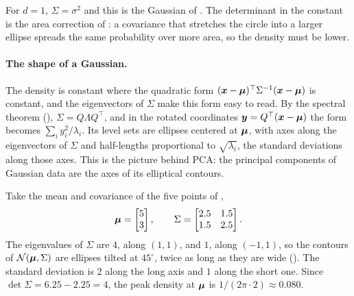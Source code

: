 For $d = 1$, $\Sigma = \sigma^2$ and this is the Gaussian of
. The determinant in the constant is the area
correction of : a covariance that stretches the
circle into a larger ellipse spreads the same probability over more
area, so the density must be lower.

\paragraph{The shape of a Gaussian.}
The density is constant where the quadratic form $(\bm{x} -
\bm{\mu})^\top \Sigma^{-1} (\bm{x} - \bm{\mu})$ is constant, and
the eigenvectors of $\Sigma$ make this form easy to read. By the
spectral theorem (), $\Sigma = Q\Lambda Q^\top$,
and in the rotated coordinates $\bm{y} = Q^\top(\bm{x} -
\bm{\mu})$ the form becomes $\sum_i y_i^2/\lambda_i$. Its level sets
are ellipses centered at $\bm{\mu}$, with axes along the eigenvectors
of $\Sigma$ and half-lengths proportional to $\sqrt{\lambda_i}$, the
standard deviations along those axes. This is the picture behind PCA:
the principal components of Gaussian data are the axes of its
elliptical contours.

\begin{example}
  \label{ex:ch05-mvn}
  Take the mean and covariance of the five points of
  ,
  \[
    \bm{\mu} = \begin{bmatrix} 5 \\ 3 \end{bmatrix},
    \qquad
    \Sigma = \begin{bmatrix} 2.5 & 1.5 \\ 1.5 & 2.5 \end{bmatrix}.
  \]
  The eigenvalues of $\Sigma$ are $4$, along $(1, 1)$, and $1$, along
  $(-1, 1)$, so the contours of $\mathcal{N}(\bm{\mu}, \Sigma)$ are
  ellipses tilted at $45^\circ$, twice as long as they are wide
  (). The standard deviation is $2$ along the long
  axis and $1$ along the short one. Since $\det \Sigma = 6.25 - 2.25 =
  4$, the peak density at $\bm{\mu}$ is $1/(2\pi \cdot 2) \approx
  0.080$.
\end{example}

